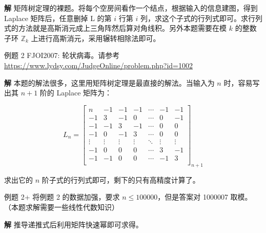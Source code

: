 \textbf{解} 矩阵树定理的裸题。将每个空房间看作一个结点，根据输入的信息建图，得到 Laplace 矩阵后，任意删掉 L 的第 $i$ 行第 $i$ 列，求这个子式的行列式即可。求行列式的方法就是高斯消元成上三角阵然后算对角线积。另外本题需要在模 $k$ 的整数子环 $\mathbb{Z}_k$ 上进行高斯消元，采用辗转相除法即可。

\begin{NOTE}{例题 2}{}
FJOI2007: 轮状病毒。请参考\url{https://www.lydsy.com/JudgeOnline/problem.php?id=1002}

\end{NOTE}


\textbf{解} 本题的解法很多，这里用矩阵树定理是最直接的解法。当输入为 $n$ 时，容易写出其 $n+1$ 阶的 Laplace 矩阵为：

$$
L_n = \begin{bmatrix}
n&  -1&  -1&  -1&  \cdots&  -1&  -1\\
-1&  3&  -1&  0&  \cdots&  0&  -1\\
-1&  -1&  3&  -1&  \cdots&  0&  0\\
-1&  0&  -1&  3&  \cdots&  0&  0\\
\vdots&  \vdots&  \vdots&  \vdots&  \ddots&  \vdots&  \vdots\\
-1&  0&  0&  0&  \cdots&  3&  -1\\
-1&  -1&  0&  0&  \cdots&  -1&  3\\
\end{bmatrix}_{n+1}
$$

求出它的 $n$ 阶子式的行列式即可，剩下的只有高精度计算了。

\begin{NOTE}{例题 2+}{}
将例题 2 的数据加强，要求 $n\leq 100000$，但是答案对 1000007 取模。（本题求解需要一些线性代数知识）

\end{NOTE}


\textbf{解} 推导递推式后利用矩阵快速幂即可求得。

